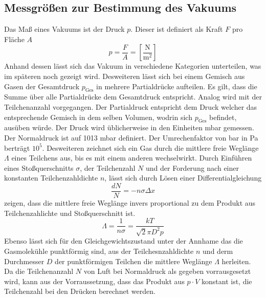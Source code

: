 \subsection{Messgrößen zur Bestimmung des Vakuums}
Das Maß eines Vakuums ist der Druck $p$. Dieser ist definiert als Kraft $F$ pro Fläche $A$
\begin{equation}
  p = \frac{F}{A} = \left[ \frac{\text{N}}{\text{m}^2} \right]
  \label{eqn:druck}
\end{equation}
Anhand dessen lässt sich das Vakuum in verschiedene Kategorien unterteilen, was im späteren noch gezeigt wird. Desweiteren lässt sich bei einem Gemisch aus Gasen der Gesamtdruck $p_\text{Ges}$ in mehrere Partialdrücke aufteilen. Es gilt, dass die Summe über alle Partialdrücke dem Gesamtdruck entspricht. Analog wird mit der Teilchenanzahl vorgegangen. Der Partialdruck entspricht dem Druck welcher das entsprechende Gemisch in dem selben Volumen, wodrin sich $p_\text{Ges}$ befindet, ausüben würde. \newline
Der Druck wird üblicherweise in den Einheiten mbar gemessen. Der Normaldruck ist auf 1013 mbar definiert. Der Umrechenfaktor von bar in Pa berträgt $10^{5}$. \newline
Desweiteren zeichnet sich ein Gas durch die mittlere freie Weglänge $\Lambda$ eines Teilchens aus, bis es mit einem anderen wechselwirkt. Durch Einführen eines Stoßquerschnitts $\sigma$, der Teilchenzahl $N$ und der Forderung nach einer konstanten Teilchenzahldichte $n$, lässt sich durch Lösen einer Differentialgleichung
\begin{equation}
  \frac{dN}{N} = -n \sigma \Delta x
  \label{eqn:mfWDGL}
\end{equation}
zeigen, dass die mittlere freie Weglänge invers proportional zu dem Produkt aus Teilchenzahlichte und Stoßquerschnitt ist.
\begin{equation}
  \Lambda = \frac{1}{n \sigma}= \frac{k T}{\sqrt{2} \pi D^2 p}
  \label{eqn:mfW}
\end{equation}
Ebenso lässt sich für den Gleichgewichtszustand unter der Annhame das die Gasmolekühle punktförmig sind, aus der Teilchesnzahldichte $n$ und derm Durchmesser $D$ der punktförmigen Teilchen die mittlere Weglänge $\Lambda$ herleiten. Da die Teilchenanzahl $N$ von Luft bei Normaldruck als gegeben vorrausgesetzt wird, kann aus der Vorraussetzung, dass das Produkt aus $p\cdot V$ konstant ist, die Teilchenzahl bei den Drücken berechnet werden.
